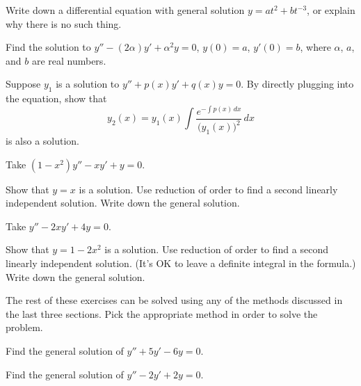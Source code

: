 \begin{exercise}
Write down a differential equation with general solution $y=at^2+bt^{-3}$, or explain why there is no such thing.
\end{exercise}

\begin{exercise}
Find the solution to
$y''-(2\alpha) y' + \alpha^2 y=0$, $y(0) = a$, $y'(0)=b$,
where $\alpha$, $a$, and $b$ are real numbers.
\end{exercise}

\begin{exercise} \label{exercise:reductionoforder}
Suppose $y_1$ is a solution to $y'' + p(x) y' + q(x) y = 0$.
By directly plugging into the equation,
show that
\begin{equation*}
y_2(x) = y_1(x) \int \frac{e^{-\int p(x)\,dx}}{{\bigl(y_1(x)\bigr)}^2} \,dx
\end{equation*}
is also a solution.
\end{exercise}

\begin{exercise}
Take 
$(1-x^2)y''-xy' + y = 0$.
\begin{tasks}
\task Show that $y=x$ is a solution.
\task Use reduction of order to find a second linearly independent solution.
\task Write down the general solution.
\end{tasks}
\end{exercise}

\begin{exercise}
Take 
$y''-2xy' + 4y = 0$.
\begin{tasks}
\task Show that $y=1-2x^2$ is a solution.  
\task Use reduction of order to find a second linearly independent solution.
(It's OK to leave a definite integral in the formula.)
\task Write down the general solution.
\end{tasks}
\end{exercise}

\noindent The rest of these exercises can be solved using any of the methods discussed in the last three sections. Pick the appropriate method in order to solve the problem.

\begin{exercise}
Find the general solution of $y'' + 5y' - 6y = 0$.
\end{exercise}

\begin{exercise}
Find the general solution of $y'' - 2y' + 2y = 0$.
\end{exercise}

